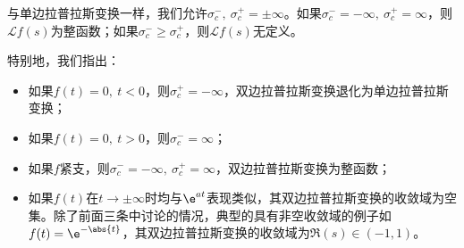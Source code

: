 与单边拉普拉斯变换一样，我们允许$\sigma_{c}^-,\ \sigma_{c}^+=\pm\infty$。如果$\sigma_{c}^-=-\infty,\ \sigma_c^+=\infty$，则$\mathcal{L}f(s)$为整函数；如果$\sigma_{c}^-\geq\sigma_c^+$，则$\mathcal{L}f(s)$无定义。

特别地，我们指出：
\begin{itemize}
    \item 如果$f(t)=0,\ t<0$，则$\sigma_{c}^+=-\infty$，双边拉普拉斯变换退化为单边拉普拉斯变换；
    \item 如果$f(t)=0,\ t>0$，则$\sigma_{c}^-=\infty$；
    \item 如果$f$紧支，则$\sigma_{c}^-=-\infty,\ \sigma_c^+=\infty$，双边拉普拉斯变换为整函数；
    \item 如果$f(t)$在$t\to\pm\infty$时均与$\e^{at}$表现类似，其双边拉普拉斯变换的收敛域为空集。除了前面三条中讨论的情况，典型的具有非空收敛域的例子如$f(t)=\e^{-\abs{t}}$，其双边拉普拉斯变换的收敛域为$\Re(s)\in(-1,1)$。
\end{itemize}
